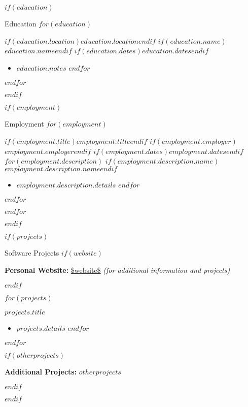 \documentclass{mcdowellcv}
\begin{document}
  \makeheader

  $if(education)$
  \begin{cvsection}{Education}
    $for(education)$
    \begin{cvsubsection}
      {$if(education.location)$$education.location$$endif$}
      {$if(education.name)$$education.name$$endif$}
      {$if(education.dates)$$education.dates$$endif$}
      \begin{itemize}
        $for(education.notes)$
        \item $education.notes$
        $endfor$
      \end{itemize}
    \end{cvsubsection}
    $endfor$
  \end{cvsection}
  $endif$

  $if(employment)$
  \begin{cvsection}{Employment}
    $for(employment)$
    \begin{cvsubsection}
      {$if(employment.title)$$employment.title$$endif$}
      {$if(employment.employer)$$employment.employer$$endif$}
      {$if(employment.dates)$$employment.dates$$endif$}
      $for(employment.description)$
      $if(employment.description.name)$$employment.description.name$$endif$
      \begin{itemize}
        $for(employment.description.details)$
        \item $employment.description.details$
        $endfor$
      \end{itemize}
      $endfor$
    \end{cvsubsection}
    $endfor$
  \end{cvsection}
  $endif$
  
  $if(projects)$
  \begin{cvsection}{Software Projects}
    $if(website)$
    \begin{cvsubsectiontext}{\textbf{Personal Website:} \url{$website$} \textit{(for additional information and projects)}}
    \end{cvsubsectiontext}
    $endif$
      
    $for(projects)$
    \begin{cvsubsection}{$projects.title$}{}{}
      \begin{itemize}
        $for(projects.details)$
        \item $projects.details$
        $endfor$
      \end{itemize}
    \end{cvsubsection}
    $endfor$

    $if(otherprojects)$
    \begin{cvsubsectiontext}{\textbf{Additional Projects:} $otherprojects$}
    \end{cvsubsectiontext}
    $endif$
  \end{cvsection}
  $endif$
\end{document}
